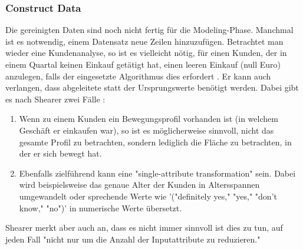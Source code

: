 \subsubsection{Construct Data}
Die gereinigten Daten sind noch nicht fertig für die Modeling-Phase. Manchmal ist es notwendig, einem Datensatz neue Zeilen hinzuzufügen. Betrachtet man wieder eine Kundenanalyse, so ist es vielleicht nötig, für einen Kunden, der in einem Quartal keinen Einkauf getätigt hat, einen leeren Einkauf (null Euro) anzulegen, falls der eingesetzte Algorithmus dies erfordert \citep[S.~22]{chapman_crisp-dm_2000}. Er kann auch verlangen, dass abgeleitete  statt der Ursprungswerte benötigt werden. Dabei gibt es nach Shearer zwei Fälle \citep[S.~16]{shearer_crisp-dm_2000}:
\begin{enumerate}
\item Wenn zu einem Kunden ein Bewegungsprofil vorhanden ist (in welchem Geschäft er einkaufen war), so ist es möglicherweise sinnvoll, nicht das gesamte Profil zu betrachten, sondern lediglich die Fläche zu betrachten, in der er sich bewegt hat.
\item Ebenfalls zielführend kann eine "single-attribute transformation" sein. Dabei wird beispielsweise das genaue Alter der Kunden in Altersspannen umgewandelt oder sprechende Werte wie '("definitely yes," "yes," "don't know," "no")' in numerische Werte übersetzt.
\end{enumerate}
Shearer merkt aber auch an, dass es nicht immer sinnvoll ist dies zu tun, auf jeden Fall "nicht nur um die Anzahl der Inputattribute zu reduzieren." \citep[S.~16; eigene Übersetzung]{shearer_crisp-dm_2000}

